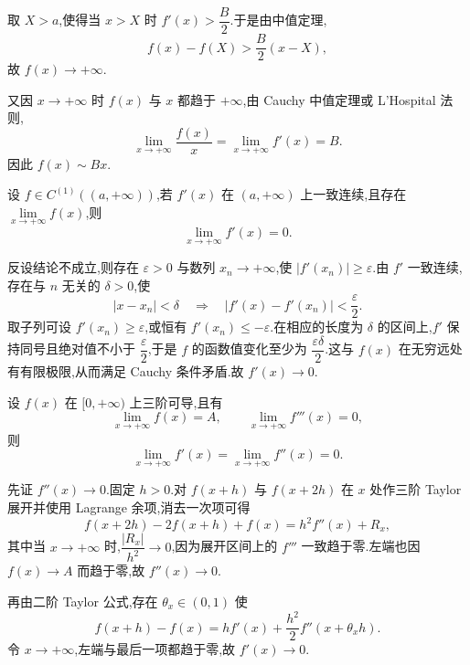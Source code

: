 \begin{solution}
    取 $X>a$,使得当 $x>X$ 时 $f'(x)>\dfrac{B}{2}$.于是由中值定理,
    \[
        f(x)-f(X)>\dfrac{B}{2}(x-X),
    \]
    故 $f(x)\to+\infty$.

    又因 $x\to+\infty$ 时 $f(x)$ 与 $x$ 都趋于 $+\infty$,由 Cauchy 中值定理或 L'Hospital 法则,
    \[
        \displaystyle\lim\limits_{x\to+\infty}\dfrac{f(x)}{x}
        =\lim\limits_{x\to+\infty}f'(x)=B.
    \]
    因此 $f(x)\sim Bx$.
\end{solution}

\begin{example}[\markstar]
    设 $f\in C^{(1)}((a,+\infty))$,若 $f'(x)$ 在 $(a,+\infty)$ 上一致连续,且存在 $\displaystyle\lim\limits_{x\to+\infty}f(x)$,则
    \[
        \displaystyle\lim\limits_{x\to+\infty}f'(x)=0.
    \]
\end{example}
\exampleblank

\begin{solution}
    反设结论不成立,则存在 $\varepsilon>0$ 与数列 $x_n\to+\infty$,使 $|f'(x_n)|\geq\varepsilon$.由 $f'$ 一致连续,存在与 $n$ 无关的 $\delta>0$,使
    \[
        |x-x_n|<\delta
        \quad\Longrightarrow\quad
        |f'(x)-f'(x_n)|<\dfrac{\varepsilon}{2}.
    \]
    取子列可设 $f'(x_n)\geq\varepsilon$,或恒有 $f'(x_n)\leq-\varepsilon$.在相应的长度为 $\delta$ 的区间上,$f'$ 保持同号且绝对值不小于 $\dfrac{\varepsilon}{2}$,于是 $f$ 的函数值变化至少为 $\dfrac{\varepsilon\delta}{2}$.这与 $f(x)$ 在无穷远处有有限极限,从而满足 Cauchy 条件矛盾.故 $f'(x)\to0$.
\end{solution}

\begin{example}[\markstar]
    设 $f(x)$ 在 $\lbrack 0,+\infty)$ 上三阶可导,且有
    \[
        \displaystyle\lim\limits_{x\to+\infty}f(x)=A,
        \qquad
        \lim\limits_{x\to+\infty}f'''(x)=0,
    \]
    则
    \[
        \displaystyle\lim\limits_{x\to+\infty}f'(x)
        =\lim\limits_{x\to+\infty}f''(x)=0.
    \]
\end{example}
\exampleblank

\begin{solution}
    先证 $f''(x)\to0$.固定 $h>0$.对 $f(x+h)$ 与 $f(x+2h)$ 在 $x$ 处作三阶 Taylor 展开并使用 Lagrange 余项,消去一次项可得
    \[
        f(x+2h)-2f(x+h)+f(x)
        =h^2f''(x)+R_x,
    \]
    其中当 $x\to+\infty$ 时,$\dfrac{|R_x|}{h^2}\to0$,因为展开区间上的 $f'''$ 一致趋于零.左端也因 $f(x)\to A$ 而趋于零,故 $f''(x)\to0$.

    再由二阶 Taylor 公式,存在 $\theta_x\in(0,1)$ 使
    \[
        f(x+h)-f(x)
        =hf'(x)+\dfrac{h^2}{2}f''(x+\theta_xh).
    \]
    令 $x\to+\infty$,左端与最后一项都趋于零,故 $f'(x)\to0$.
\end{solution}

